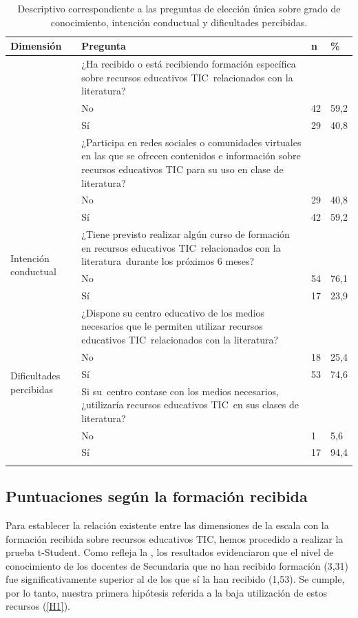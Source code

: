 \documentclass[spanish]{textolivre}
\begin{document}
\begin{table}[htbp]
\caption{Descriptivo correspondiente a las preguntas de elección única sobre grado de conocimiento, intención conductual y dificultades percibidas.}
\label{tbl01}
\begin{tabular}{lp{}ll}
\toprule
Dimensión & Pregunta & n & \% \\ 
\midrule
\arrayrulecolor[gray]{.7}
\multirow{7}{*}{Grado de conocimiento} & 
¿Ha recibido o está recibiendo formación específica sobre recursos educativos TIC relacionados con la literatura? & & \\
 & {\hfill} No & 42 & 59,2 \\
 & {\hfill} Sí & 29 & 40,8 \\
 & ¿Participa en redes sociales o comunidades virtuales en las que se ofrecen contenidos e información sobre recursos educativos TIC para su uso en clase de literatura? & & \\
 & {\hfill} No & 29 & 40,8 \\
 & {\hfill} Sí & 42 & 59,2 \\
\midrule

\multirow{3}{*}{Intención conductual} & 
¿Tiene previsto realizar algún curso de formación en recursos educativos TIC relacionados con la literatura durante los próximos 6 meses? & & \\
 & {\hfill} No & 54 & 76,1 \\
 & {\hfill} Sí & 17 & 23,9 \\
\midrule
 
\multirow{6}{*}{Dificultades percibidas} & 
¿Dispone su centro educativo de los medios necesarios que le permiten utilizar recursos educativos TIC relacionados con la literatura? & & \\
 & {\hfill} No & 18 & 25,4 \\
 & {\hfill} Sí & 53 & 74,6 \\
 & Si su centro contase con los medios necesarios, ¿utilizaría recursos educativos TIC en sus clases de literatura? & & \\
 & {\hfill} No & 1 & 5,6 \\
 & {\hfill} Sí & 17 & 94,4 \\
\arrayrulecolor[gray]{.7}
\bottomrule
\end{tabular}
\end{table}

\subsection{Puntuaciones según la formación recibida}\label{sec-organizacao}
Para establecer la relación existente entre las dimensiones de la escala con la formación recibida sobre recursos educativos TIC, hemos procedido a realizar la prueba t-Student. Como refleja la , los resultados evidenciaron que el nivel de conocimiento de los docentes de Secundaria que no han recibido formación (3,31) fue significativamente superior al de los que sí la han recibido (1,53). Se cumple, por lo tanto, nuestra primera hipótesis referida a la baja utilización de estos recursos (\ref{H1}).
\end{document}
